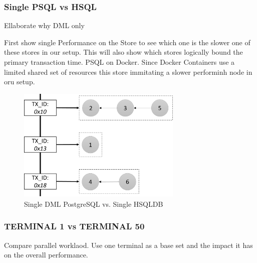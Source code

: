 

\subsubsection{ Single PSQL vs HSQL } 

Ellaborate why DML only

First show single Performance on the Store to see which one is the slower one of these stores in our setup.
This will also show which stores logically bound the primary transaction time. PSQL on Docker. Since Docker Containers use a limited shared set of resources 
this store immitating a slower performinh node in oru setup.

\begin{figure}[t] 
    \centering 
    \includegraphics[width=0.7\textwidth]{Figures/store_comparision.png}
    \caption{Single DML PostgreSQL vs. Single HSQLDB}
    \label{fig:store_comparision}
\end{figure}






\subsubsection{TERMINAL 1 vs TERMINAL 50 } 

Compare parallel worklaod. Use one terminal as a base set and the impact
it has on the overall performance.

